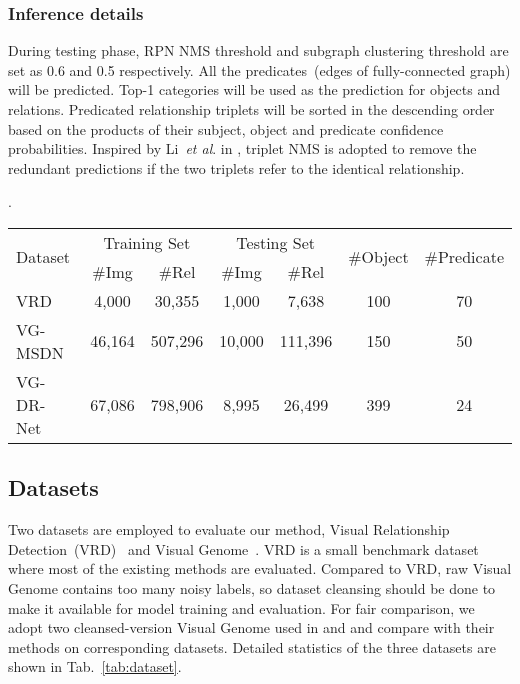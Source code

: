 \documentclass[runningheads]{llncs}
\newcommand{\etal}{\textit{et al}. }
\begin{document}
\subsubsection{Inference details}
During testing phase, RPN NMS threshold and subgraph clustering threshold are set as 0.6 and 0.5 respectively. All the predicates~(edges of fully-connected graph) will be predicted. Top-1 categories will be used as the prediction for objects and relations.  Predicated relationship triplets will be sorted in the descending order based on the products of their subject, object and predicate confidence probabilities. Inspired by Li~\etal in \cite{li2017vip}, triplet NMS is adopted to remove the redundant predictions if the two triplets refer to the identical relationship. \begin{table*}[t]
	\renewcommand{\arraystretch}{1.1}
	\setlength{\tabcolsep}{3.8pt}
	\small
	\caption{Dataset statistics. \textbf{VG-MSDN} and \textbf{VG-DR-Net} are two cleansed-version of raw Visual Genome dataset. \textbf{\#Img} denotes the number of images. \textbf{\#Rel} denotes the number of subject-predicate-object relation pairs. \textbf{\#Object} and \textbf{\#Predicate} denotes the number of object and predicate categories respectively. }.
	\begin{center}
	\begin{tabular}{l|cc | cc | c|c}
	\hline
	\multirow{2}{*}{Dataset} & \multicolumn{2}{c}{Training Set} \vline & \multicolumn{2}{c}{Testing Set}\vline & \multirow{2}{*}{\#Object} & \multirow{2}{*}{\#Predicate	} \\
	& \#Img & \#Rel & \#Img & \#Rel & \\\hline
	VRD~\cite{visual_relationship} & 4,000 & 30,355 & 1,000 & 7,638 & 100 & 70 \\
	VG-MSDN~\cite{li2017scene,visual_genome} & 46,164 & 507,296 & 10,000 & 111,396 & 150 & 50 \\
	VG-DR-Net~\cite{dai2017detecting,visual_genome} & 67,086 & 798,906 & 8,995 & 26,499 & 399 & 24\\
	\hline
	\end{tabular}
	\end{center}
	\label{tab:dataset}
\end{table*}


\subsection{Datasets}

Two datasets are employed to evaluate our method, Visual Relationship Detection~(VRD)~\cite{visual_relationship} and Visual Genome~\cite{visual_genome}. VRD is a small benchmark dataset where most of the existing methods are evaluated. Compared to VRD, raw Visual Genome contains too many noisy labels, so dataset cleansing should be done to make it available for model training and evaluation. For fair comparison, we adopt two cleansed-version Visual Genome used in \cite{li2017scene} and \cite{dai2017detecting} and compare with their methods on corresponding datasets. Detailed statistics of the three datasets are shown in Tab.~\ref{tab:dataset}.
\end{document}
